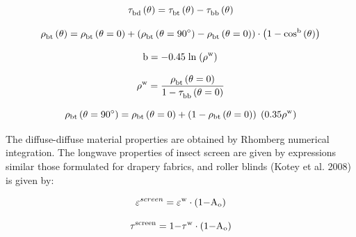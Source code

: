 \begin{equation}
{\rm{\tau }}_{{\rm{bd}}}^{}\left( {\rm{\theta }} \right) = {\rm{\tau }}_{{\rm{bt}}}^{}\left( {\rm{\theta }} \right) - {\rm{\tau }}_{{\rm{bb}}}^{}\left( {\rm{\theta }} \right)
\end{equation}

\begin{equation}
{\rm{\rho }}_{{\rm{bt}}}^{}\left( {\rm{\theta }} \right) = {\rm{\rho }}_{{\rm{bt}}}^{}\left( {{\rm{\theta }} = {\rm{0}}} \right) + \left( {{\rm{\rho }}_{{\rm{bt}}}^{}\left( {{\rm{\theta }} = 9{\rm{0}}^\circ } \right) - {\rm{\rho }}_{{\rm{bt}}}^{}\left( {{\rm{\theta }} = {\rm{0}}} \right)} \right) \cdot \left( {1 - {\rm{co}}{{\rm{s}}^{\rm{b}}}\left( {\rm{\theta }} \right)} \right)
\end{equation}

\begin{equation}
{\rm{b}} =  - {\rm{0}}{\rm{.45}}\;{\rm{ln}}\;{\left( {{{\rm{\rho }}^{\rm{w}}}} \right)^{}}
\end{equation}

\begin{equation}
{\rm{\rho }}_{}^{\rm{w}} = \frac{{{\rm{\rho }}_{{\rm{bt}}}^{}\left( {{\rm{\theta }} = {\rm{0}}} \right)}}{{{\rm{1}} - {\rm{\tau }}_{{\rm{bb}}}^{}\left( {{\rm{\theta }} = {\rm{0}}} \right)}}
\end{equation}

\begin{equation}
{\rho_{{\rm{bt}}}}\left( {{\rm{\theta }} = {\rm{90}}^\circ } \right) = {\rho_{{\rm{bt}}}}\left( {{\rm{\theta }} = {\rm{0}}} \right) + \left( {1 - {\rho_{{\rm{bt}}}}\left( {{\rm{\theta }} = {\rm{0}}} \right)} \right)\;\left( {{\rm{0}}{\rm{.35}}{\rho ^{\rm{w}}}} \right)
\end{equation}

The diffuse-diffuse material properties are obtained by Rhomberg numerical integration. The longwave properties of insect screen are given by expressions similar those formulated for drapery fabrics, and roller blinds (Kotey et al. 2008) is given by:

\begin{equation}
{\varepsilon ^{screen}} = {\varepsilon ^{\rm{w}}} \cdot \left( {{\rm{1  -  }}{{\rm{A}}_{\rm{o}}}} \right)
\end{equation}

\begin{equation}
{\tau ^{{\rm{screen}}}} = {\rm{1 - }}{\tau ^{\rm{w}}} \cdot \left( {{\rm{1  -  }}{{\rm{A}}_{\rm{o}}}} \right)
\end{equation}

